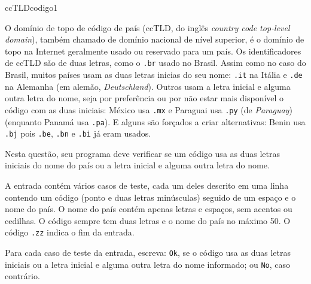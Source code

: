 \documentclass[12pt,a4paper,oneside]{article}
\begin{document}
\begin{problem}{ccTLD}{codigo}{1}

O domínio de topo de código de país (ccTLD, do inglês \textit{country code top-level domain}), também chamado de domínio nacional de nível superior, é o domínio de topo na Internet geralmente usado ou reservado para um país. Os identificadores de ccTLD são de duas letras, como o \texttt{.br} usado no Brasil. Assim como no caso do Brasil, muitos países usam as duas letras inicias do seu nome: \texttt{.it} na Itália e \texttt{.de} na Alemanha (em alemão, \textit{Deutschland}). Outros usam a letra inicial e alguma outra letra do nome, seja por preferência ou por não estar mais disponível o código com as duas iniciais: México usa \texttt{.mx} e Paraguai usa \texttt{.py} (de \textit{Paraguay}) (enquanto Panamá usa \texttt{.pa}). E alguns são forçados a criar alternativas: Benin usa \texttt{.bj} pois \texttt{.be}, \texttt{.bn} e \texttt{.bi} já eram usados.

Nesta questão, seu programa deve verificar se um código usa as duas letras iniciais do nome do país ou a letra inicial e alguma outra letra do nome.



\InputFile

A entrada contém vários casos de teste, cada um deles descrito em uma linha contendo um código (ponto e duas letras minúsculas) seguido de um espaço e o nome do país. O nome do país contém apenas letras e espaços, sem acentos ou cedilhas. O código sempre tem duas letras e o nome do país no máximo 50. O código \texttt{.zz} indica o fim da entrada.

\OutputFile

Para cada caso de teste da entrada, escreva: \texttt{Ok}, se o código usa as duas letras iniciais ou a letra inicial e alguma outra letra do nome informado; ou \texttt{No}, caso contrário.


\Example

\begin{example}
%
\end{example}


\end{problem}
\end{document}
